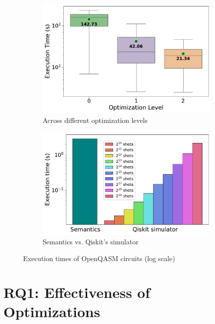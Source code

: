\begin{figure}[t]
	\centering
	\begin{subfigure}{0.48\textwidth}
		\centering
		\includegraphics[width=\textwidth]{imgs/opt-bench.pdf}
		\caption{Across different optimization levels}
		\label{fig:result-opt-performance}
	\end{subfigure}
	\hspace{1em}
	\begin{subfigure}{0.48\textwidth}
		\centering
		\includegraphics[width=\textwidth]{imgs/sim-bench.pdf}
		\caption{Semantics vs. Qiskit's simulator}
		\label{fig:result-performance}
		\vspace{0.9em}
	\end{subfigure}
	\caption{Execution times of OpenQASM circuits (log scale)}
\end{figure}

\section{RQ1: Effectiveness of Optimizations}
\label{ch:evaluation:rq1}

